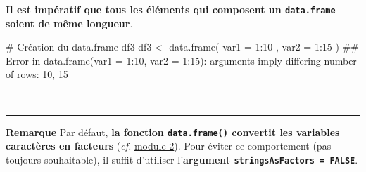 \documentclass[12pt,twosided, notitlepage]{book}
\newenvironment{Shaded}{}{}
\newcommand{\CommentTok}[1]{\textcolor[rgb]{0.00,0.50,0.00}{#1}}
\newcommand{\DataTypeTok}[1]{#1}
\newcommand{\DecValTok}[1]{#1}
\newcommand{\KeywordTok}[1]{\textcolor[rgb]{0.00,0.00,1.00}{#1}}
\newcommand{\NormalTok}[1]{#1}
\newcommand{\OperatorTok}[1]{#1}
\newcommand{\OtherTok}[1]{\textcolor[rgb]{1.00,0.25,0.00}{#1}}
\newcommand{\StringTok}[1]{\textcolor[rgb]{0.00,0.50,0.50}{#1}}
\renewenvironment{Shaded}{\begin{snugshade}}{\end{snugshade}}
\begin{document}
\begin{Shaded}
\end{Shaded}

\textbf{Il est impératif que tous les éléments qui composent un
\texttt{data.frame} soient de même longueur}.

\begin{Shaded}
\begin{Highlighting}[]
\CommentTok{# Création du data.frame df3}
\NormalTok{df3 <-}\StringTok{ }\KeywordTok{data.frame}\NormalTok{(}
  \DataTypeTok{var1 =} \DecValTok{1}\OperatorTok{:}\DecValTok{10}
\NormalTok{  , }\DataTypeTok{var2 =} \DecValTok{1}\OperatorTok{:}\DecValTok{15}
\NormalTok{)}
\NormalTok{  ## Error in data.frame(var1 = 1:10, var2 = 1:15): arguments imply differing number of rows: 10, 15}
\end{Highlighting}
\end{Shaded}

~

\begin{center}\rule{0.5\linewidth}{\linethickness}\end{center}

\textbf{Remarque} Par défaut, \textbf{la fonction \texttt{data.frame()}
convertit les variables caractères en facteurs} (\emph{cf.}
\underline{module 2}). Pour éviter ce comportement (pas toujours
souhaitable), il suffit d'utiliser l'\textbf{argument
\texttt{stringsAsFactors\ =\ FALSE}}.
\end{document}
